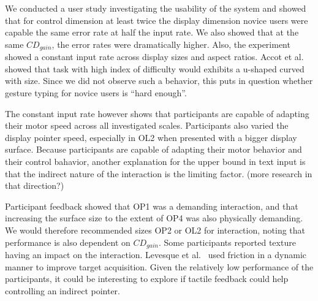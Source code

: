 \documentclass{chi-ext}
\newcommand{\cdt}[1]{{\small\uppercase{{#1}}}}
\begin{document}
We conducted a user study investigating the usability of the system and showed that for control dimension at least twice the display dimension novice users were capable the same error rate at half the input rate. We also showed that at the same $CD_{gain}$, the error rates were dramatically higher. Also, the experiment showed a constant input rate across display sizes and aspect ratios. Accot et al.~\cite{Accot2001} showed that task with high index of difficulty would exhibits a u-shaped curved with size. Since we did not observe such a behavior, this puts in question whether gesture typing for novice users is “hard enough”.

The constant input rate however shows that participants are capable of adapting their motor speed across all investigated scales. Participants also varied the display pointer speed, especially in \cdt{OL2} when presented with a bigger display surface. Because participants are capable of adapting their motor behavior and their control bahavior, another explanation for the upper bound in text input is that the indirect nature of the interaction is the limiting factor. (more research in that direction?)

Participant feedback showed that \cdt{OP1} was a demanding interaction, and that increasing the surface size to the extent of \cdt{OP4} was also physically demanding. We would therefore recommended sizes \cdt{OP2} or \cdt{OL2} for interaction, noting that performance is also dependent on $CD_{gain}$. Some participants reported texture having an impact on the interaction. Levesque et al.~\cite{Levesque2011} used friction in a dynamic manner to improve target acquisition. Given the relatively low performance of the participants, it could be interesting to explore if tactile feedback could help controlling an indirect pointer.

\end{document}
